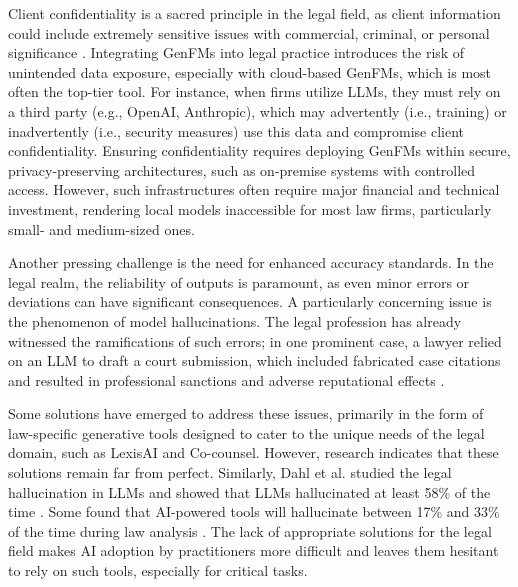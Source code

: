 Client confidentiality is a sacred principle in the legal field, as client information could include extremely sensitive issues with commercial, criminal, or personal significance \cite{hazard1978historical}. Integrating GenFMs into legal practice introduces the risk of unintended data exposure, especially with cloud-based GenFMs, which is most often the top-tier tool. For instance, when firms utilize LLMs, they must rely on a third party (e.g., OpenAI, Anthropic), which may advertently (i.e., training) or inadvertently (i.e., security measures) use this data and compromise client confidentiality. Ensuring confidentiality requires deploying GenFMs within secure, privacy-preserving architectures, such as on-premise systems with controlled access. However, such infrastructures often require major financial and technical investment, rendering local models inaccessible for most law firms, particularly small- and medium-sized ones.

Another pressing challenge is the need for enhanced accuracy standards. In the legal realm, the reliability of outputs is paramount, as even minor errors or deviations can have significant consequences. A particularly concerning issue is the phenomenon of model hallucinations. The legal profession has already witnessed the ramifications of such errors; in one prominent case, a lawyer relied on an LLM to draft a court submission, which included fabricated case citations and resulted in professional sanctions and adverse reputational effects \cite{legg2024generative}. 
 
Some solutions have emerged to address these issues, primarily in the form of law-specific generative tools designed to cater to the unique needs of the legal domain, such as LexisAI and Co-counsel. However, research indicates that these solutions remain far from perfect. Similarly, Dahl et al. studied the legal hallucination in LLMs and showed that LLMs hallucinated at least 58\% of the time \cite{dahl2024large}. Some found that AI-powered tools will hallucinate between 17\% and 33\% of the time during law analysis \cite{magesh2024hallucination}. The lack of appropriate solutions for the legal field makes AI adoption by practitioners more difficult and leaves them hesitant to rely on such tools, especially for critical tasks. 

